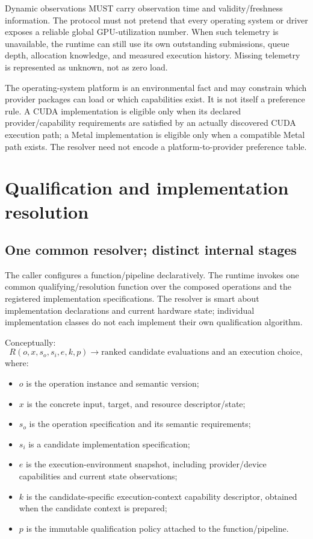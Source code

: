 \documentclass[11pt,a4paper,oneside]{article}
\begin{document}
Dynamic observations MUST carry observation time and validity/freshness information. The protocol must not pretend that every operating system or driver exposes a reliable global GPU-utilization number. When such telemetry is unavailable, the runtime can still use its own outstanding submissions, queue depth, allocation knowledge, and measured execution history. Missing telemetry is represented as unknown, not as zero load.

The operating-system platform is an environmental fact and may constrain which provider packages can load or which capabilities exist. It is not itself a preference rule. A CUDA implementation is eligible only when its declared provider/capability requirements are satisfied by an actually discovered CUDA execution path; a Metal implementation is eligible only when a compatible Metal path exists. The resolver need not encode a platform-to-provider preference table.

\section{Qualification and implementation resolution}

\subsection{One common resolver; distinct internal stages}

The caller configures a function/pipeline declaratively. The runtime invokes one common qualifying/resolution function over the composed operations and the registered implementation specifications. The resolver is smart about implementation declarations and current hardware state; individual implementation classes do not each implement their own qualification algorithm.

Conceptually:
\[
  R(o, x, s_o, s_i, e, k, p) \longrightarrow
  \text{ranked candidate evaluations and an execution choice},
\]
where:
\begin{itemize}
  \item $o$ is the operation instance and semantic version;
  \item $x$ is the concrete input, target, and resource descriptor/state;
  \item $s_o$ is the operation specification and its semantic requirements;
  \item $s_i$ is a candidate implementation specification;
  \item $e$ is the execution-environment snapshot, including provider/device capabilities and current state observations;
  \item $k$ is the candidate-specific execution-context capability descriptor, obtained when the candidate context is prepared;
  \item $p$ is the immutable qualification policy attached to the function/pipeline.
\end{itemize}
\end{document}

